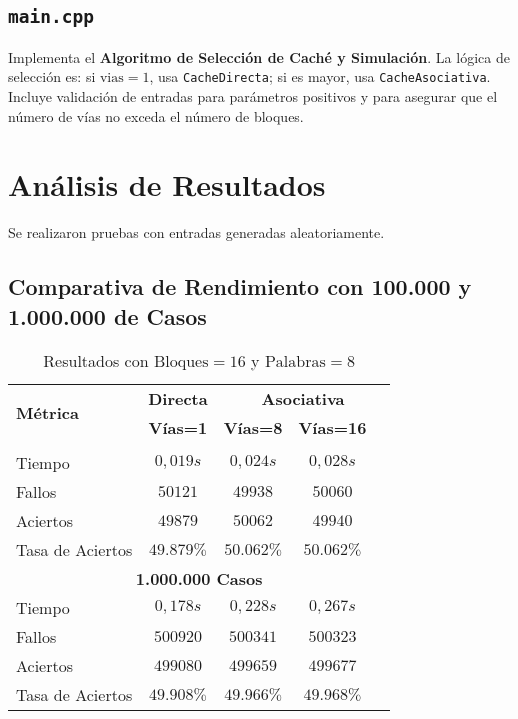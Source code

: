 \documentclass{article}
\begin{document}
\subsection{\texttt{main.cpp}}
Implementa el \textbf{Algoritmo de Selección de Caché y Simulación}. La lógica de selección es: si $\text{vias}=1$, usa \texttt{CacheDirecta}; si es mayor, usa \texttt{CacheAsociativa}. Incluye validación de entradas para parámetros positivos y para asegurar que el número de vías no exceda el número de bloques.

\section{Análisis de Resultados}

Se realizaron pruebas con entradas generadas aleatoriamente.

\subsection{Comparativa de Rendimiento con 100.000 y 1.000.000 de Casos}
\begin{longtable}{|p{2.5cm}|c|c|c|c|}
\caption{Resultados con $\text{Bloques}=16$ y $\text{Palabras}=8$} \label{tab:comparativa} \\
\hline
\multirow{2}{*}{\textbf{Métrica}} & \textbf{Directa} & \multicolumn{3}{c|}{\textbf{Asociativa}} \\
\cline{2-5}
& \textbf{Vías=1} & \textbf{Vías=8} & \textbf{Vías=16} \\
\hhline{|=|=|=|=|=|}
\multicolumn{5}{|c|}{\textbf{100.000 Casos}} \\
\hline
Tiempo & $0,019s$ & $0,024s$ & $0,028s$ \\
\hline
Fallos & $50121$ & $49938$ & $50060$ \\
\hline
Aciertos & $49879$ & $50062$ & $49940$ \\
\hline
Tasa de Aciertos & $49.879\%$ & $50.062\%$ & $50.062\%$ \\
\hline
\multicolumn{5}{|c|}{\textbf{1.000.000 Casos}} \\
\hline
Tiempo & $0,178s$ & $0,228s$ & $0,267s$ \\
\hline
Fallos & $500920$ & $500341$ & $500323$ \\
\hline
Aciertos & $499080$ & $499659$ & $499677$ \\
\hline
Tasa de Aciertos & $49.908\%$ & $49.966\%$ & $49.968\%$ \\
\hline
\end{longtable}
\end{document}
